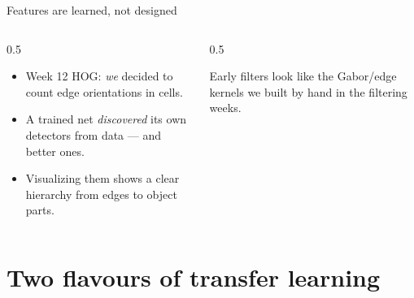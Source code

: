 \documentclass[10pt,aspectratio=169]{beamer}
\begin{document}
\begin{frame}{Features are learned, not designed}
  \begin{columns}[T]
    \begin{column}{0.5\textwidth}
      \begin{itemize}
        \item Week 12 HOG: \emph{we} decided to count edge orientations in cells.
        \item A trained net \emph{discovered} its own detectors from data — and better ones.
        \item Visualizing them shows a clear hierarchy from edges to object parts.
      \end{itemize}
    \end{column}
    \begin{column}{0.5\textwidth}
      \begin{center}
      \end{center}
      \begin{infobox}[Same as W6]
        Early filters look like the Gabor/edge kernels we built by hand in the filtering weeks.
      \end{infobox}
    \end{column}
  \end{columns}
\end{frame}

\section{Two flavours of transfer learning}
\end{document}
